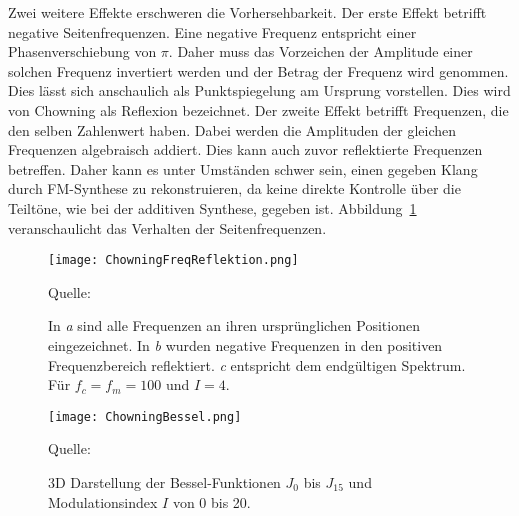 Zwei weitere Effekte erschweren die Vorhersehbarkeit. Der erste Effekt betrifft negative Seitenfrequenzen. Eine negative Frequenz entspricht einer Phasenverschiebung von $\pi$. Daher muss das Vorzeichen der Amplitude einer solchen Frequenz invertiert werden und der Betrag der Frequenz wird genommen. Dies lässt sich anschaulich als Punktspiegelung am Ursprung vorstellen. Dies wird von Chowning als Reflexion bezeichnet. Der zweite Effekt betrifft Frequenzen, die den selben Zahlenwert haben. Dabei werden die Amplituden der gleichen Frequenzen algebraisch addiert. Dies kann auch zuvor reflektierte Frequenzen betreffen. Daher kann es unter Umständen schwer sein, einen gegeben Klang durch FM-Synthese zu rekonstruieren, da keine direkte Kontrolle über die Teiltöne, wie bei der additiven Synthese, gegeben ist. Abbildung~\ref{fig:chowningFreqReflektion} veranschaulicht das Verhalten der Seitenfrequenzen.

\begin{figure} [ht]
\centering
  \texttt{[image: ChowningFreqReflektion.png]}
\caption{In \textit{a} sind alle Frequenzen an ihren ursprünglichen Positionen eingezeichnet. In \textit{b} wurden negative Frequenzen in den positiven Frequenzbereich reflektiert. \textit{c} entspricht dem endgültigen Spektrum. Für $f_c=f_m=100$ und $I=4$.}
\label{fig:chowningFreqReflektion}
Quelle: \cite{chowningPaper}
\end{figure}
\FloatBarrier


\begin{figure} [ht]
\centering
  \texttt{[image: ChowningBessel.png]}
\caption{3D Darstellung der Bessel-Funktionen $J_0$ bis $J_{15}$ und Modulationsindex $I$ von 0 bis 20. }
\label{fig:bessel3D}
Quelle: \cite{chowningPaper}
\end{figure}


\FloatBarrier
